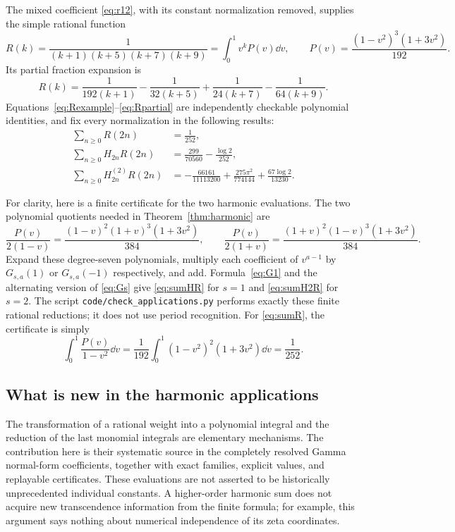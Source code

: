 \documentclass[11pt,letterpaper]{article}
\numberwithin{equation}{section}
\theoremstyle{plain}
\theoremstyle{definition}
\theoremstyle{remark}
\newcommand{\src}[1]{\nolinkurl{#1}}
\begin{document}
The mixed coefficient \eqref{eq:r12}, with its constant normalization removed, supplies the simple rational function
\begin{equation}\label{eq:Rexample}
 R(k)=\frac1{(k+1)(k+5)(k+7)(k+9)}
     =\int_0^1v^kP(v)\dd v,
 \qquad P(v)=\frac{(1-v^2)^3(1+3v^2)}{192}.
\end{equation}
Its partial fraction expansion is
\begin{equation}\label{eq:Rpartial}
 R(k)=\frac1{192(k+1)}-\frac1{32(k+5)}
       +\frac1{24(k+7)}-\frac1{64(k+9)}.
\end{equation}
Equations~\eqref{eq:Rexample}--\eqref{eq:Rpartial} are independently checkable polynomial identities, and fix every normalization in the following results:
\begin{align}
 \sum_{n\ge0}R(2n)&=\frac1{252},\label{eq:sumR}\\
 \sum_{n\ge0}H_{2n}R(2n)
   &=\frac{299}{70560}-\frac{\log2}{252},\label{eq:sumHR}\\
 \sum_{n\ge0}H_{2n}^{(2)}R(2n)
   &=-\frac{66161}{11113200}
      +\frac{275\pi^2}{774144}
      +\frac{67\log2}{13230}.\label{eq:sumH2R}
\end{align}

For clarity, here is a finite certificate for the two harmonic evaluations. The two polynomial quotients needed in Theorem~\ref{thm:harmonic} are
\[
 \frac{P(v)}{2(1-v)}=
 \frac{(1-v)^2(1+v)^3(1+3v^2)}{384},\qquad
 \frac{P(v)}{2(1+v)}=
 \frac{(1+v)^2(1-v)^3(1+3v^2)}{384}.
\]
Expand these degree-seven polynomials, multiply each coefficient of $v^{a-1}$ by $G_{s,a}(1)$ or $G_{s,a}(-1)$ respectively, and add. Formula~\eqref{eq:G1} and the alternating version of \eqref{eq:Gs} give \eqref{eq:sumHR} for $s=1$ and \eqref{eq:sumH2R} for $s=2$. The script \src{code/check_applications.py} performs exactly these finite rational reductions; it does not use period recognition. For \eqref{eq:sumR}, the certificate is simply
\[
 \int_0^1\frac{P(v)}{1-v^2}\dd v
 =\frac1{192}\int_0^1(1-v^2)^2(1+3v^2)\dd v=\frac1{252}.
\]

\subsection{What is new in the harmonic applications}

The transformation of a rational weight into a polynomial integral and the reduction of the last monomial integrals are elementary mechanisms. The contribution here is their systematic source in the completely resolved Gamma normal-form coefficients, together with exact families, explicit values, and replayable certificates. These evaluations are not asserted to be historically unprecedented individual constants. A higher-order harmonic sum does not acquire new transcendence information from the finite formula; for example, this argument says nothing about numerical independence of its zeta coordinates.
\end{document}
